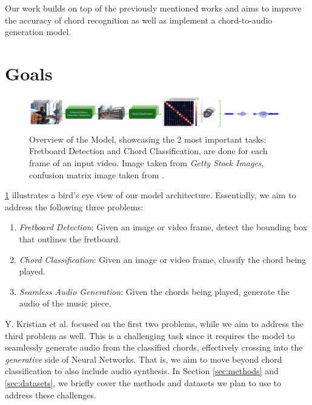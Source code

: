 \documentclass[10pt,twocolumn,letterpaper]{article}
\begin{document}
Our work builds on top of the previously mentioned works \cite{Kristian_Zaman_Tenoyo_Jodhinata_2024}
\cite{du2023conditional} and aims to improve the accuracy of chord recognition as well as implement a chord-to-audio generation model.

\section{Goals}

\begin{figure}[h]
    \centering
    \includegraphics[width=\textwidth]{images/task-diagram.pdf}
    \caption{Overview of the Model, showcasing the 2 most important tasks:
 Fretboard Detection and Chord Classification, are done for each frame of an input video. Image taken from \textit{Getty Stock Images}, confusion matrix image taken from \cite{Kristian_Zaman_Tenoyo_Jodhinata_2024}.}
    \label{fig:model-diagram}
\end{figure}

\cref{fig:model-diagram} illustrates a bird's eye view of our model architecture. Essentially, we aim to address the following three problems:
\begin{enumerate}[label=\arabic*), itemsep=0.25pt]
    \item \emph{Fretboard Detection}: Given an image or video frame, detect the bounding box that outlines the fretboard.
    \item \emph{Chord Classification}: Given an image or video frame, classify the chord being played.
    \item \emph{Seamless Audio Generation}: Given the chords being played, generate the audio of the music piece.
\end{enumerate}
Y. Kristian et al. \cite{Kristian_Zaman_Tenoyo_Jodhinata_2024} focused on the first two problems, while we aim to address the third problem as well. This is a challenging task since it requires the model to seamlessly generate audio from the classified chords, effectively crossing into the \emph{generative} side of Neural Networks. That is, we aim to move beyond chord classification to also include audio synthesis. In Section \cref{sec:methods} and \cref{sec:datasets}, we briefly cover the methods and datasets we plan to use to address these challenges.
\end{document}
